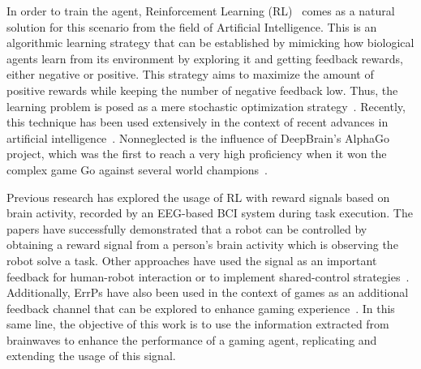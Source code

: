 \documentclass[journal]{IEEEtran}
\begin{document}
In order to train the agent, Reinforcement Learning (RL)~\cite{Santos1999} comes as a natural solution for this scenario from the field of Artificial Intelligence.  This is an algorithmic learning strategy that can be established by mimicking how biological agents learn from its environment by exploring it and getting feedback rewards, either negative or positive.  This strategy aims to maximize the amount of positive rewards while keeping the number of negative feedback low.  Thus, the learning problem is  posed as a mere stochastic optimization strategy~\cite{sutton2018reinforcement}.  Recently, this technique has been used extensively in the context of recent advances in artificial intelligence~\cite{REF}. Nonneglected is the influence of DeepBrain's AlphaGo project, which was the first to reach a very high proficiency when it won the complex game Go against several world champions~\cite{ALPHA-GO}.


Previous research has explored the usage of RL with reward signals based on brain activity, recorded by an EEG-based BCI system during task execution. The papers \cite{ROBOT-CONTROL-PAPER,Kim2017,Omedes2013} have successfully demonstrated that a robot can be controlled by obtaining a reward signal from a person's brain activity which is observing the robot solve a task.  Other approaches have used the signal as an important feedback for human-robot interaction or to implement shared-control strategies~\cite{Schiatti2018}.  Additionally, ErrPs have also been used in the context of games as an additional feedback channel that can be explored to enhance gaming experience~\cite{Plass-OudeBos2010,kober2018bci}.  In this same line, the objective of this work is to use the information extracted from brainwaves to enhance the performance of a gaming agent, replicating and extending the usage of this signal.


%
%
\end{document}
